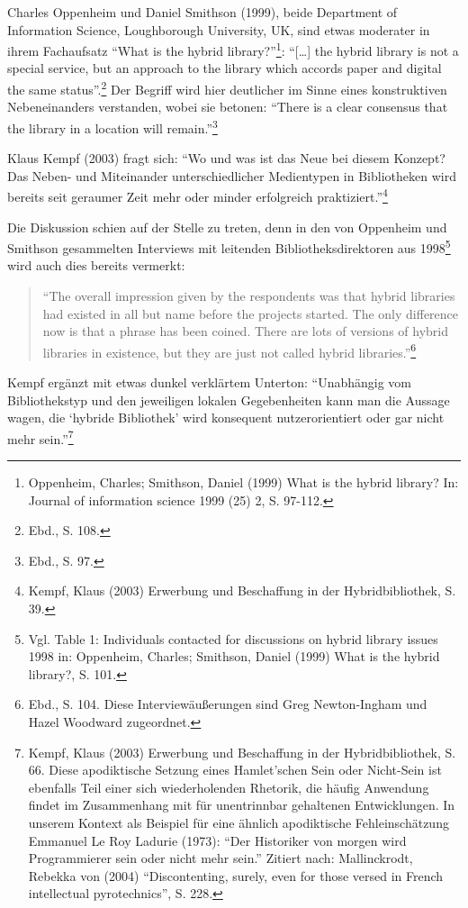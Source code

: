 \documentclass[a4paper,
fontsize=11pt,
oneside,
numbers=noperiodatend,
parskip=half-,
bibliography=totoc,
final
]{scrartcl}
\begin{document}
Charles Oppenheim und Daniel Smithson (1999), beide Department of
Information Science, Loughborough University, UK, sind etwas moderater
in ihrem Fachaufsatz \enquote{What is the hybrid library?}\footnote{Oppenheim,
  Charles; Smithson, Daniel (1999) What is the hybrid library? In:
  Journal of information science 1999 (25) 2, S. 97-112.}:
\enquote{{[}\ldots{}{]} the hybrid library is not a special service, but
an approach to the library which accords paper and digital the same
status}.\footnote{Ebd., S. 108.} Der Begriff wird hier deutlicher im
Sinne eines konstruktiven Nebeneinanders verstanden, wobei sie betonen:
\enquote{There is a clear consensus that the library in a location will
remain.}\footnote{Ebd., S. 97.}

Klaus Kempf (2003) fragt sich: \enquote{Wo und was ist das Neue bei
diesem Konzept? Das Neben- und Miteinander unterschiedlicher Medientypen
in Bibliotheken wird bereits seit geraumer Zeit mehr oder minder
erfolgreich praktiziert.}\footnote{Kempf, Klaus (2003) Erwerbung und
  Beschaffung in der Hybridbibliothek, S. 39.}

Die Diskussion schien auf der Stelle zu treten, denn in den von
Oppenheim und Smithson gesammelten Interviews mit leitenden
Bibliotheksdirektoren aus 1998\footnote{Vgl. Table 1: Individuals
  contacted for discussions on hybrid library issues 1998 in: Oppenheim,
  Charles; Smithson, Daniel (1999) What is the hybrid library?, S. 101.}
wird auch dies bereits vermerkt:

\begin{quote}
\enquote{The overall impression given by the respondents was that hybrid
libraries had existed in all but name before the projects started. The
only difference now is that a phrase has been coined. There are lots of
versions of hybrid libraries in existence, but they are just not called
hybrid libraries.}\footnote{Ebd., S. 104. Diese Interviewäußerungen sind
  Greg Newton-Ingham und Hazel Woodward zugeordnet.}
\end{quote}

Kempf ergänzt mit etwas dunkel verklärtem Unterton: \enquote{Unabhängig
vom Bibliothekstyp und den jeweiligen lokalen Gegebenheiten kann man die
Aussage wagen, die \enquote{hybride Bibliothek} wird konsequent
nutzerorientiert oder gar nicht mehr sein.}\footnote{Kempf, Klaus (2003)
  Erwerbung und Beschaffung in der Hybridbibliothek, S. 66. Diese
  apodiktische Setzung eines Hamlet'schen Sein oder Nicht-Sein ist
  ebenfalls Teil einer sich wiederholenden Rhetorik, die häufig
  Anwendung findet im Zusammenhang mit für unentrinnbar gehaltenen
  Entwicklungen. In unserem Kontext als Beispiel für eine ähnlich
  apodiktische Fehleinschätzung Emmanuel Le Roy Ladurie (1973):
  \enquote{Der Historiker von morgen wird Programmierer sein oder nicht
  mehr sein.} Zitiert nach: Mallinckrodt, Rebekka von (2004)
  \enquote{Discontenting, surely, even for those versed in French
  intellectual pyrotechnics}, S. 228.}
\end{document}
